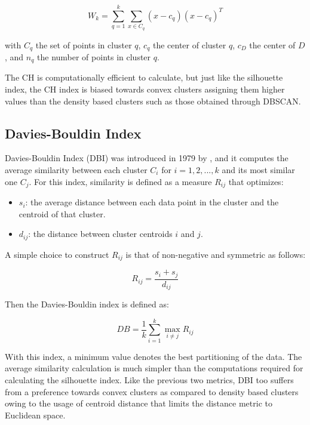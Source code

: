 \documentclass[../UNBThesis2.tex]{subfiles}
\begin{document}
\begin{equation}
    W_k = \sum_{q=1}^k \sum_{x \in C_q} (x - c_q) (x - c_q)^T
\end{equation}

with $C_q$ the set of points in cluster $q$, $c_q$ the center of cluster $q$, $c_D$ the center of $D$, and $n_q$ the number of points in cluster $q$.



The CH is computationally efficient to calculate, but just like the silhouette index, the CH index is biased towards convex clusters assigning them higher values than the density based clusters such as those obtained through DBSCAN.

\subsection{Davies-Bouldin Index}

Davies-Bouldin Index (DBI) was introduced in 1979 by \cite{4766909}, and it computes the average similarity between each cluster $C_i$ for $i = 1,2,...,k$ and its most similar one $C_j$.  For this index, similarity is defined as a measure $R_{ij}$ that optimizes:

\begin{itemize}
    \item $s_i$: the average distance between each data point in the cluster and the centroid of that cluster.
    \item $d_{ij}$: the distance between cluster centroids $i$ and $j$.
\end{itemize}

A simple choice to construct $R_{ij}$ is that of non-negative and symmetric as follows:

\begin{equation}
    R_{ij} = \frac{s_i + s_j}{d_{ij}}
\end{equation}

Then the Davies-Bouldin index is defined as:

\begin{equation}
    DB = \frac{1}{k} \sum_{i=1}^k \max_{i \neq j} R_{ij}
\end{equation}

 With this index, a minimum value denotes the best partitioning of the data. The average similarity calculation is much simpler than the computations required for calculating the silhouette index. Like the previous two metrics, DBI too suffers from a preference towards convex clusters as compared to density based clusters owing to the usage of centroid distance that limits the distance metric to Euclidean space.
\end{document}
